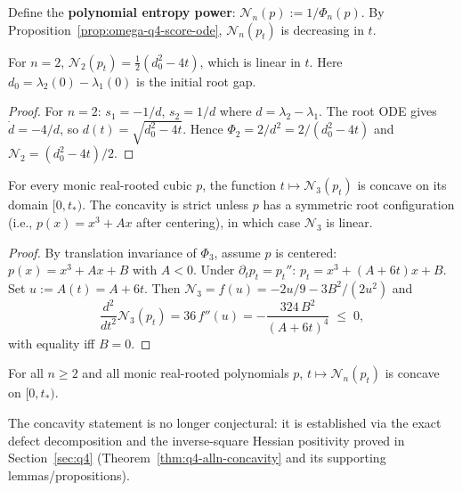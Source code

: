 Define the \textbf{polynomial entropy power}:
$\mathcal N_n(p) := 1/\Phi_n(p)$.
By Proposition~\ref{prop:omega-q4-score-ode},
$\mathcal N_n(p_t)$ is decreasing in $t$.

\begin{proposition}[Linearity for $n=2$]\label{prop:omega-q4-linear-n2}
For $n=2$, $\mathcal N_2(p_t) = \frac12(d_0^2 - 4t)$,
which is linear in $t$.
Here $d_0=\lambda_2(0)-\lambda_1(0)$ is the initial root gap.
\end{proposition}

\begin{proof}
For $n=2$: $s_1=-1/d$, $s_2=1/d$ where $d=\lambda_2-\lambda_1$.
The root ODE gives $\dot d = -4/d$, so $d(t)=\sqrt{d_0^2-4t}$.
Hence $\Phi_2 = 2/d^2 = 2/(d_0^2-4t)$ and
$\mathcal N_2 = (d_0^2-4t)/2$.
\end{proof}


\begin{theorem}[Concavity for $n=3$]\label{thm:omega-q4-concavity-n3}
For every monic real-rooted cubic $p$, the function
$t\mapsto\mathcal N_3(p_t)$ is concave on its domain $[0,t_*)$.
The concavity is strict unless $p$ has a symmetric root configuration
(i.e., $p(x)=x^3+Ax$ after centering), in which case
$\mathcal N_3$ is linear.
\end{theorem}

\begin{proof}
By translation invariance of $\Phi_3$, assume $p$ is centered:
$p(x) = x^3 + Ax + B$ with $A<0$.
Under $\partial_t p_t = p_t''$:
$p_t = x^3 + (A+6t)x + B$.
Set $u:=A(t)=A+6t$.  Then
$\mathcal N_3 = f(u)=-2u/9-3B^2/(2u^2)$ and
\[
\frac{d^2}{dt^2}\mathcal N_3(p_t)
= 36\,f''(u)
= -\frac{324\,B^2}{(A+6t)^4}
\;\le\; 0,
\]
with equality iff $B=0$.
\end{proof}


\begin{theorem}\label{thm:omega-q4-concavity}
For all $n\ge 2$ and all monic real-rooted polynomials $p$,
$t\mapsto\mathcal N_n(p_t)$ is concave on $[0,t_*)$.
\end{theorem}

\begin{remark}
The concavity statement is no longer conjectural:
it is established via the exact defect decomposition and the
inverse-square Hessian positivity proved in
Section~\ref{sec:q4} (Theorem~\ref{thm:q4-alln-concavity}
and its supporting lemmas/propositions).
\end{remark}


